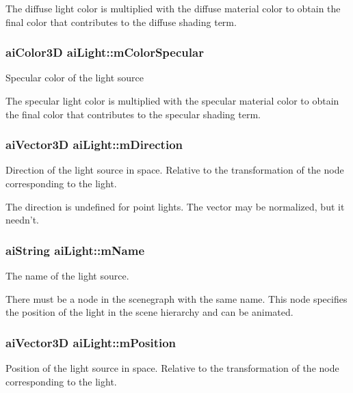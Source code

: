 The diffuse light color is multiplied with the diffuse material color to obtain the final color that contributes to the diffuse shading term. \hypertarget{structai_light_aa79ae6ad6a10f0cb9c740e23b6bb01bf}{
\subsubsection[{m\-Color\-Specular}]{ {\bf ai\-Color3\-D} ai\-Light\-::m\-Color\-Specular}}\label{structai_light_aa79ae6ad6a10f0cb9c740e23b6bb01bf}
Specular color of the light source

The specular light color is multiplied with the specular material color to obtain the final color that contributes to the specular shading term. \hypertarget{structai_light_af3776d5e4e6065cb6dd7e10dc656dada}{
\subsubsection[{m\-Direction}]{ {\bf ai\-Vector3\-D} ai\-Light\-::m\-Direction}}\label{structai_light_af3776d5e4e6065cb6dd7e10dc656dada}
Direction of the light source in space. Relative to the transformation of the node corresponding to the light.

The direction is undefined for point lights. The vector may be normalized, but it needn't. \hypertarget{structai_light_a92806413f16230728b04e5f379fd00c0}{
\subsubsection[{m\-Name}]{ {\bf ai\-String} ai\-Light\-::m\-Name}}\label{structai_light_a92806413f16230728b04e5f379fd00c0}
The name of the light source.

There must be a node in the scenegraph with the same name. This node specifies the position of the light in the scene hierarchy and can be animated. \hypertarget{structai_light_a5daf9c9ad2613603b847a527123611f0}{
\subsubsection[{m\-Position}]{ {\bf ai\-Vector3\-D} ai\-Light\-::m\-Position}}\label{structai_light_a5daf9c9ad2613603b847a527123611f0}
Position of the light source in space. Relative to the transformation of the node corresponding to the light.


